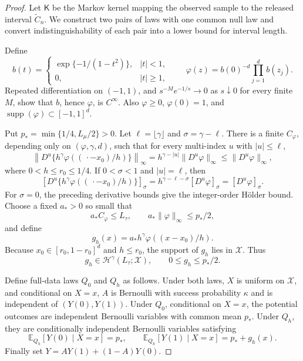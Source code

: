 \documentclass{article}
\begin{document}
\begin{proof}
Let \(\mathsf K\) be the Markov kernel mapping the observed sample to the released interval \(\widetilde C_n\).  We construct two pairs of laws with one common null law and convert indistinguishability of each pair into a lower bound for interval length.

Define
\[
 b(t)=
 \begin{cases}
  \exp\{-1/(1-t^2)\},& |t|<1,\\
  0,& |t|\ge1,
 \end{cases}
 \qquad
 \varphi(z)=b(0)^{-d}\prod_{j=1}^d b(z_j).
\]
Repeated differentiation on \((-1,1)\), and \(s^{-M}e^{-1/s}\to0\) as \(s\downarrow0\) for every finite \(M\), show that \(b\), hence \(\varphi\), is \(C^\infty\).  Also \(\varphi\ge0\), \(\varphi(0)=1\), and \(\operatorname{supp}(\varphi)\subset[-1,1]^d\).

Put \(p_* = \min\{1/4,L_\mu/2\}>0\).  Let \(\ell=\lfloor\gamma\rfloor\) and \(\sigma=\gamma-\ell\).  There is a finite \(C_\varphi\), depending only on \((\varphi,\gamma,d)\), such that for every multi-index \(u\) with \(|u|\le\ell\),
\[
 \left\|D^u\{h^\gamma\varphi((\,\cdot-x_0)/h)\}\right\|_\infty
 =h^{\gamma-|u|}\|D^u\varphi\|_\infty
 \le \|D^u\varphi\|_\infty,
\]
where \(0<h\le r_0\le1/4\).  If \(0<\sigma<1\) and \(|u|=\ell\), then
\[
 \left[D^u\{h^\gamma\varphi((\,\cdot-x_0)/h)\}\right]_{\sigma}
 =h^{\gamma-\ell-\sigma}[D^u\varphi]_{\sigma}
 =[D^u\varphi]_{\sigma}.
\]
For \(\sigma=0\), the preceding derivative bounds give the integer-order H\"older bound.  Choose a fixed \(a_*>0\) so small that
\[
 a_*C_\varphi\le L_\tau,
 \qquad a_*\|\varphi\|_\infty\le p_*/2,
\]
and define
\[
 g_h(x)=a_*h^\gamma\varphi((x-x_0)/h).
\]
Because \(x_0\in[r_0,1-r_0]^d\) and \(h\le r_0\), the support of \(g_h\) lies in \(\mathcal X\).  Thus
\[
 g_h\in\mathcal H^\gamma(L_\tau;\mathcal X),
 \qquad 0\le g_h\le p_*/2.
\tag{1}
\]

Define full-data laws \(Q_0\) and \(Q_h\) as follows.  Under both laws, \(X\) is uniform on \(\mathcal X\), and conditional on \(X=x\), \(A\) is Bernoulli with success probability \(\kappa\) and is independent of \((Y(0),Y(1))\).  Under \(Q_0\), conditional on \(X=x\), the potential outcomes are independent Bernoulli variables with common mean \(p_*\).  Under \(Q_h\), they are conditionally independent Bernoulli variables satisfying
\[
 \mathbb E_{Q_h}[Y(0)\mid X=x]=p_* ,
 \qquad
 \mathbb E_{Q_h}[Y(1)\mid X=x]=p_*+g_h(x).
\tag{2}
\]
Finally set \(Y=AY(1)+(1-A)Y(0)\).


\end{proof}
\end{document}
